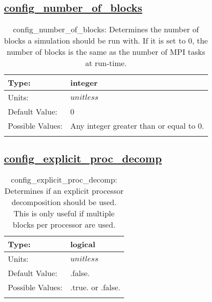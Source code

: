 \subsection[config\_number\_of\_blocks]{\hyperref[sec:nm_tab_decomposition]{config\_number\_of\_blocks}}
\label{subsec:nm_sec_config_number_of_blocks}
\begin{center}
\begin{longtable}{| p{2.0in} || p{4.0in} |}
    \hline
    Type: & integer \\
    \hline
    Units: & $unitless$ \\
    \hline
    Default Value: & 0 \\
    \hline
    Possible Values: & Any integer greater than or equal to 0. \\
    \hline
    \caption{config\_number\_of\_blocks: Determines the number of blocks a simulation should be run with. If it is set to 0, the number of blocks is the same as the number of MPI tasks at run-time.}
\end{longtable}
\end{center}
\subsection[config\_explicit\_proc\_decomp]{\hyperref[sec:nm_tab_decomposition]{config\_explicit\_proc\_decomp}}
\label{subsec:nm_sec_config_explicit_proc_decomp}
\begin{center}
\begin{longtable}{| p{2.0in} || p{4.0in} |}
    \hline
    Type: & logical \\
    \hline
    Units: & $unitless$ \\
    \hline
    Default Value: & .false. \\
    \hline
    Possible Values: & .true. or .false. \\
    \hline
    \caption{config\_explicit\_proc\_decomp: Determines if an explicit processor decomposition should be used. This is only useful if multiple blocks per processor are used.}
\end{longtable}
\end{center}
